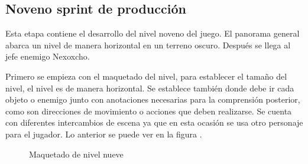 \subsection{Noveno sprint de producción}

Esta etapa contiene el desarrollo del nivel noveno del juego. El panorama general abarca un nivel de manera horizontal en un terreno oscuro. Después se llega al jefe enemigo Nexoxcho.

Primero se empieza con el maquetado del nivel, para establecer el tamaño del nivel, el nivel es de manera horizontal. Se establece también donde debe ir cada objeto o enemigo junto con anotaciones necesarias para la comprensión posterior, como son direcciones de movimiento o acciones que deben realizarse. Se cuenta con diferentes intercambios de escena ya que en esta ocasión se usa otro personaje para el jugador. Lo anterior se puede ver en la figura \cite{fig:n901}.
\begin{figure}[htbp]
	\centering
	\caption{Maquetado de nivel nueve} \label{fig:n901}
\end{figure}  

